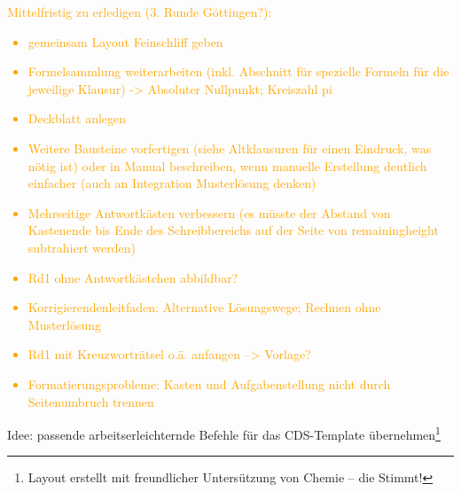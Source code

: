\documentclass[./main.tex]{subfiles}
\begin{document}
\renewcommand{\tasktitle}{To-do-Liste}
\renewcommand{\taskpoints}{0}
\renewcommand{\taskweight}{0}
\aufgabenanfang
\textcolor{orange}{Mittelfristig zu erledigen (3. Runde G\"ottingen?): 
\begin{itemize}
    \item gemeinsam Layout Feinschliff geben
    \item Formelsammlung weiterarbeiten (inkl. Abschnitt f\"ur spezielle Formeln f\"ur die jeweilige Klausur) -> Absoluter Nullpunkt; Kreiszahl pi
    \item Deckblatt anlegen
    \item Weitere Bausteine vorfertigen (siehe Altklausuren f\"ur einen Eindruck, was n\"otig ist) oder in Manual beschreiben, wenn manuelle Erstellung deutlich einfacher (auch an Integration Musterl\"osung denken)
    \item Mehrseitige Antwortkästen verbessern (es müsste der Abstand von Kastenende bis Ende des Schreibbereichs auf der Seite von remainingheight subtrahiert werden)
    \item Rd1 ohne Antwortk\"astchen abbildbar?
    \item Korrigierendenleitfaden: Alternative L\"osungswege; Rechnen ohne Musterl\"osung
    \item Rd1 mit Kreuzwortr\"atsel o.\"a. anfangen --> Vorlage?
    \item Formatierungsprobleme: Kasten und Aufgabenstellung nicht durch Seitenumbruch trennen
\end{itemize}}
Idee: passende arbeitserleichternde Befehle f\"ur das CDS-Template \"ubernehmen\footnote{Layout erstellt mit freundlicher Unters\"utzung von \glqq{}Chemie -- die Stimmt!\grqq{}}
\aufgabenende
\end{document}
